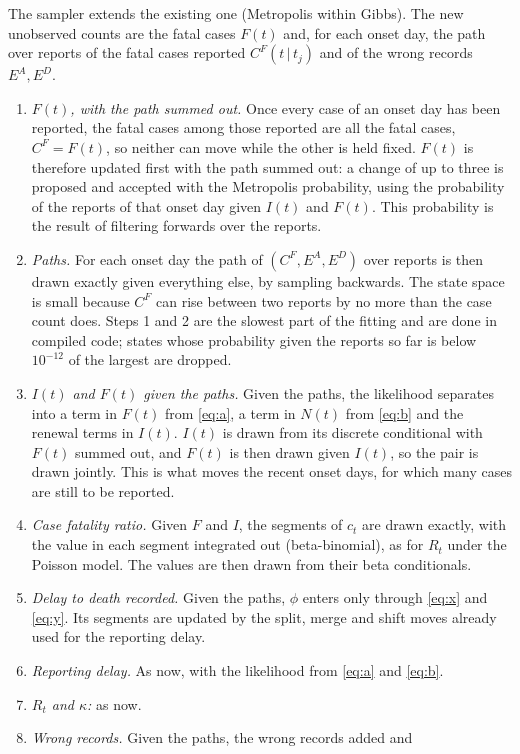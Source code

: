 \documentclass[11pt,a4paper]{article}
\newcommand{\given}{\,|\,}
\begin{document}
The sampler extends the existing one (Metropolis within Gibbs). The new
unobserved counts are the fatal cases $F(t)$ and, for each onset day, the
path over reports of the fatal cases reported $C^{F}(t\given t_j)$ and of the
wrong records $E^{A},E^{D}$.
\begin{enumerate}
\item \emph{$F(t)$, with the path summed out.} Once every case of an onset
day has been reported, the fatal cases among those reported are all the
fatal cases, $C^{F}=F(t)$, so neither can move while the other is held fixed.
$F(t)$ is therefore updated first with the path summed out: a change of up
to three is proposed and accepted with the Metropolis probability, using the
probability of the reports of that onset day given $I(t)$ and $F(t)$. This
probability is the result of filtering forwards over the reports.
\item \emph{Paths.} For each onset day the path of
$(C^{F},E^{A},E^{D})$ over reports is then drawn exactly given everything else,
by sampling backwards. The state space is small because $C^{F}$ can rise between
two reports by no more than the case count does. Steps 1 and 2 are the
slowest part of the fitting and are done in compiled code; states whose
probability given the reports so far is below $10^{-12}$ of the largest are
dropped.
\item \emph{$I(t)$ and $F(t)$ given the paths.} Given the paths, the
likelihood separates into a term in $F(t)$ from \eqref{eq:a}, a term in
$N(t)$ from \eqref{eq:b} and the renewal terms in $I(t)$. $I(t)$ is drawn
from its discrete conditional with $F(t)$ summed out, and $F(t)$ is then
drawn given $I(t)$, so the pair is drawn jointly. This is what moves the
recent onset days, for which many cases are still to be reported.
\item \emph{Case fatality ratio.} Given $F$ and $I$, the segments of $c_t$
are drawn exactly, with the value in each segment integrated out
(beta-binomial), as for $R_t$ under the Poisson model. The values are then
drawn from their beta conditionals.
\item \emph{Delay to death recorded.} Given the paths, $\phi$ enters only
through \eqref{eq:x} and \eqref{eq:y}. Its segments are updated by the
split, merge and shift moves already used for the reporting delay.
\item \emph{Reporting delay.} As now, with the likelihood from \eqref{eq:a}
and \eqref{eq:b}.
\item \emph{$R_t$ and $\kappa$:} as now.
\item \emph{Wrong records.} Given the paths, the wrong records added and

\end{enumerate}
\end{document}
